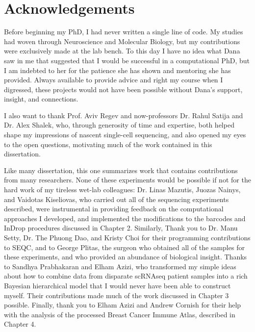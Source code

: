 \cleartorecto %
\chapter{Acknowledgements} %
\thispagestyle{plain} %

Before beginning my PhD, I had never written a single line of code. 
My studies had woven through Neuroscience and Molecular Biology, but my contributions were exclusively made at the lab bench.  
To this day I have no idea what Dana saw in me that suggested that I would be successful in a computational PhD, but I am indebted to her for the patience she has shown and mentoring she has provided. 
Always available to provide advice and right my course when I digressed, these projects would not have been possible without Dana's support, insight, and connections.

I also want to thank Prof. Aviv Regev and now-professors Dr. Rahul Satija and Dr. Alex Shalek, who, through generosity of time and expertise, both helped shape my impressions of nascent single-cell sequencing, and also opened my eyes to the open questions, motivating much of the work contained in this dissertation. 

Like many dissertation, this one summarizes work that contains contributions from many researchers. 
None of these experiments would be possible if not for the hard work of my tireless wet-lab colleagues: Dr. Linas Mazutis, Juozas Nainys, and Vaidotas Kiseliovas, who carried out all of the sequencing experiments described, were instrumental in providing feedback on the computational approaches I developed, and implemented the modifications to the barcodes and InDrop procedures discussed in Chapter 2. 
Similarly, Thank you to Dr. Manu Setty, Dr. The Phuong Dao, and Kristy Choi for their programming contributions to SEQC, and to George Plitas, the surgeon who obtained all of the samples for these experiments, and who provided an abundance of biological insight. 
Thanks to Sandhya Prabhakaran and Elham Azizi, who transformed my simple ideas about how to combine data from disparate scRNAseq patient samples into a rich Bayesian hierarchical model that I would never have been able to construct myself. Their contributions made much of the work discussed in Chapter 3 possible.  
Finally, thank you to Elham Azizi and Andrew Cornish for their help with the analysis of the processed Breast Cancer Immune Atlas, described in Chapter 4.  

